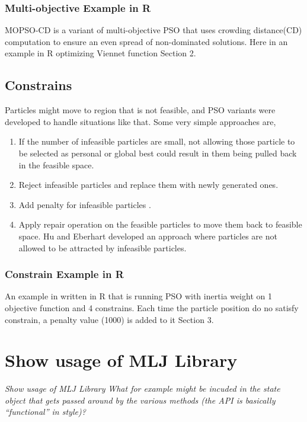 \documentclass{article}
\begin{document}
\subsubsection{Multi-objective Example in R}
MOPSO-CD is a variant of multi-objective PSO that uses crowding distance(CD) computation to ensure an even spread of non-dominated solutions. Here in an example in R optimizing Viennet  function\cite{irfan_2021R} Section 2.

\subsection{Constrains}
Particles might move to region that is not feasible, and PSO variants were developed to handle situations like that. Some very simple approaches are, 
\begin{enumerate}
    \item If the number of infeasible particles are small, not allowing those  particle to be selected as personal or global best could result in them being pulled back in the feasible space.
    \item Reject infeasible particles and replace them with newly generated ones.
    \item Add penalty for infeasible particles \cite{parsopoulos2002particle}. 
    \item Apply repair operation on the feasible particles to move them back to feasible space. Hu and Eberhart developed an approach where particles are not allowed to be attracted by infeasible particles. \cite{hu2002solving}
\end{enumerate}

\subsubsection{Constrain Example in R}
An example in written in R that is running PSO with inertia weight on 1 objective function and 4 constrains. Each time the particle position do no satisfy constrain, a penalty value (1000) is added to it \cite{irfan_2021R} Section 3.

\section{Show usage of MLJ Library}
\textit{Show usage of MLJ Library}
\textit{What for example might be incuded in the state object that gets passed around by the various methods (the API is basically “functional” in style)?}
\end{document}
